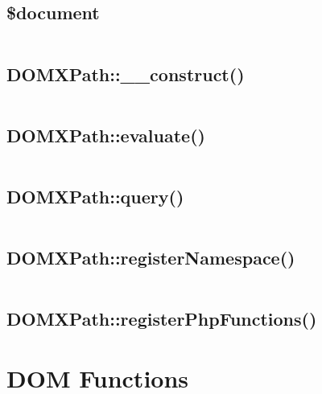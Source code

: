 \subsection{\$document}


\begin{lstlisting}[language=PHP]

\end{lstlisting}

\subsection{DOMXPath::\_\_construct()}


\begin{lstlisting}[language=PHP]

\end{lstlisting}

\subsection{DOMXPath::evaluate()}


\begin{lstlisting}[language=PHP]

\end{lstlisting}

\subsection{DOMXPath::query()}



\begin{lstlisting}[language=PHP]

\end{lstlisting}

\subsection{DOMXPath::registerNamespace()}



\begin{lstlisting}[language=PHP]

\end{lstlisting}

\subsection{DOMXPath::registerPhpFunctions()}


\section{DOM Functions}


